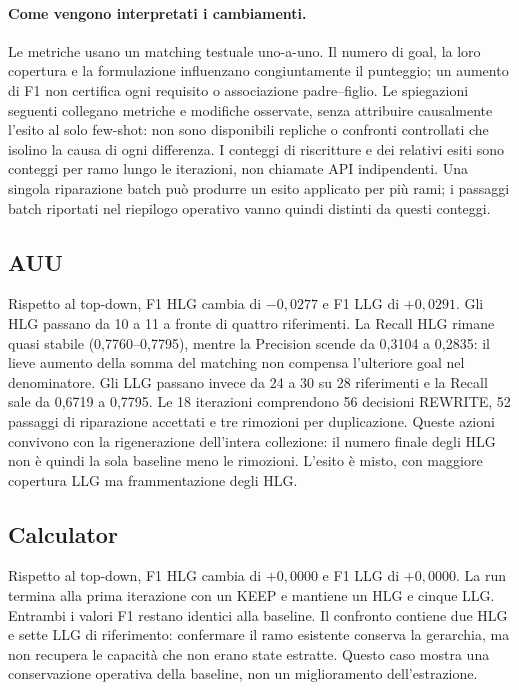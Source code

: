 \paragraph{Come vengono interpretati i cambiamenti.}
Le metriche usano un matching testuale uno-a-uno. Il numero di goal, la loro
copertura e la formulazione influenzano congiuntamente il punteggio; un aumento
di F1 non certifica ogni requisito o associazione padre--figlio. Le spiegazioni
seguenti collegano metriche e modifiche osservate, senza attribuire causalmente
l'esito al solo few-shot: non sono disponibili repliche o confronti controllati
che isolino la causa di ogni differenza.
I conteggi di riscritture e dei relativi esiti sono conteggi per ramo lungo
le iterazioni, non chiamate API indipendenti. Una singola riparazione batch
può produrre un esito applicato per più rami; i passaggi batch riportati
nel riepilogo operativo vanno quindi distinti da questi conteggi.

\subsection{AUU}
Rispetto al top-down, F1 HLG cambia di $-0,0277$ e F1 LLG di $+0,0291$. Gli HLG passano da 10 a 11 a fronte di quattro riferimenti. La Recall HLG rimane quasi stabile (0,7760--0,7795), mentre la Precision scende da 0,3104 a 0,2835: il lieve aumento della somma del matching non compensa l'ulteriore goal nel denominatore. Gli LLG passano invece da 24 a 30 su 28 riferimenti e la Recall sale da 0,6719 a 0,7795. Le 18 iterazioni comprendono 56 decisioni REWRITE, 52 passaggi di riparazione accettati e tre rimozioni per duplicazione. Queste azioni convivono con la rigenerazione dell'intera collezione: il numero finale degli HLG non è quindi la sola baseline meno le rimozioni. L'esito è misto, con maggiore copertura LLG ma frammentazione degli HLG.

\subsection{Calculator}
Rispetto al top-down, F1 HLG cambia di $+0,0000$ e F1 LLG di $+0,0000$. La run termina alla prima iterazione con un KEEP e mantiene un HLG e cinque LLG. Entrambi i valori F1 restano identici alla baseline. Il confronto contiene due HLG e sette LLG di riferimento: confermare il ramo esistente conserva la gerarchia, ma non recupera le capacità che non erano state estratte. Questo caso mostra una conservazione operativa della baseline, non un miglioramento dell'estrazione.

